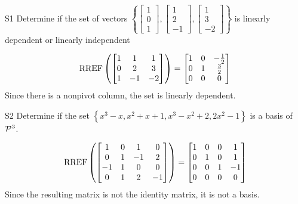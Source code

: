 \documentclass{sbgLAsemi}
\begin{document}
\begin{problem}{S1}
Determine if the set of vectors  $\left\{\begin{bmatrix} 1 \\ 0 \\ 1 \end{bmatrix}, \begin{bmatrix} 1 \\ 2 \\ -1 \end{bmatrix}, \begin{bmatrix} 1 \\ 3 \\ -2 \end{bmatrix}\right\}$ is  linearly dependent or linearly independent
\end{problem}
\begin{solution}
$$\RREF\left( \begin{bmatrix} 1 &  1 & 1 \\ 0  & 2 & 3 \\ 1  & -1 & -2 \end{bmatrix} \right) = \begin{bmatrix} 1 &  0 & -\frac{1}{2} \\ 0  & 1 & \frac{3}{2} \\ 0& 0 & 0  \end{bmatrix}$$
Since there is a nonpivot column, the set is linearly dependent.
\end{solution}

\begin{problem}{S2}
Determine if the set $\left\{ x^3-x, x^2+x+1, x^3-x^2+2, 2x^2-1 \right\}$ is a basis of $\P^3$.
\end{problem}
\begin{solution}
$$\RREF\left(\begin{bmatrix} 1 & 0 & 1 & 0 \\ 0 & 1 & -1 & 2 \\ -1 & 1 & 0 & 0 \\ 0 & 1 & 2 & -1 \end{bmatrix} \right)= \begin{bmatrix} 1 & 0 &0 & 1 \\ 0 & 1 & 0 & 1 \\ 0 & 0 & 1 & -1 \\ 0 & 0 & 0 & 0 \end{bmatrix}$$
Since the resulting matrix is not the identity matrix, it is not a basis.
\end{solution}
\end{document}
